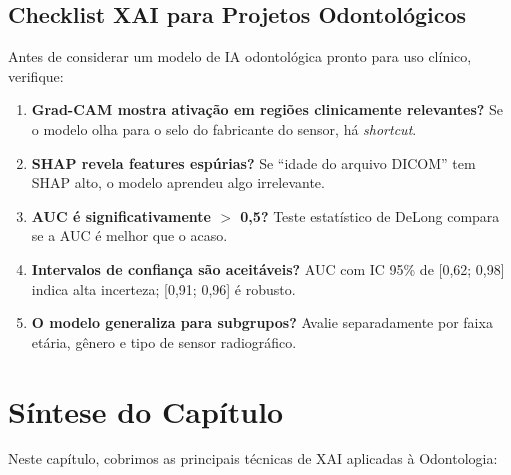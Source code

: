 
\subsection{Checklist XAI para Projetos Odontológicos}

Antes de considerar um modelo de IA odontológica pronto para uso clínico,
verifique:

\begin{enumerate}
  \item \textbf{Grad-CAM mostra ativação em regiões clinicamente relevantes?}
    Se o modelo olha para o selo do fabricante do sensor, há \textit{shortcut}.

  \item \textbf{SHAP revela features espúrias?} Se ``idade do arquivo DICOM''
    tem SHAP alto, o modelo aprendeu algo irrelevante.

  \item \textbf{AUC é significativamente $>$ 0,5?} Teste estatístico de
    DeLong compara se a AUC é melhor que o acaso.

  \item \textbf{Intervalos de confiança são aceitáveis?} AUC com IC 95\%
    de [0,62; 0,98] indica alta incerteza; [0,91; 0,96] é robusto.

  \item \textbf{O modelo generaliza para subgrupos?} Avalie separadamente
    por faixa etária, gênero e tipo de sensor radiográfico.
\end{enumerate}

\section{Síntese do Capítulo}

Neste capítulo, cobrimos as principais técnicas de XAI aplicadas à
Odontologia:

